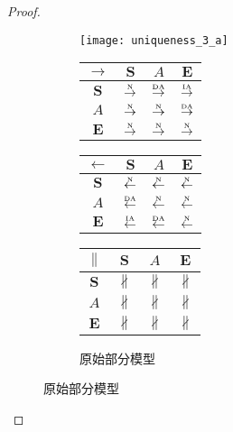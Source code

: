 \begin{proof}
\begin{figure}[htbp]
  \begin{subfigure}{1\textwidth}
    \centering
    \begin{minipage}[b]{1\textwidth}
      \centering
      \texttt{[image: uniqueness\_3\_a]}
    \end{minipage}
    \begin{minipage}[b]{0.3\textwidth}
      \vspace{1em}
      \centering
      \begin{tabular}{|c|c|c|c|} \hline
        $\rightarrow$ & $\bm{S}$ & $A$ & $\bm{E}$\\ \hline
        $\bm{S}$ & $\overset{\text{\tiny{N}}}{\rightarrow}$ & $\overset{\text{\tiny{DA}}}{\rightarrow}$ & $\overset{\text{\tiny{IA}}}{\rightarrow}$\\ \hline
        $A$ & $\overset{\text{\tiny{N}}}{\rightarrow}$ & $\overset{\text{\tiny{N}}}{\rightarrow}$ & $\overset{\text{\tiny{DA}}}{\rightarrow}$\\ \hline
        $\bm{E}$ & $\overset{\text{\tiny{N}}}{\rightarrow}$ & $\overset{\text{\tiny{N}}}{\rightarrow}$ & $\overset{\text{\tiny{N}}}{\rightarrow}$\\ \hline
      \end{tabular}
    \end{minipage}
    \begin{minipage}[b]{0.3\textwidth}
      \vspace{1em}
      \centering
      \begin{tabular}{|c|c|c|c|} \hline
        $\leftarrow$ & $\bm{S}$ & $A$ & $\bm{E}$\\ \hline
        $\bm{S}$ & $\overset{\text{\tiny{N}}}{\leftarrow}$ & $\overset{\text{\tiny{N}}}{\leftarrow}$ & $\overset{\text{\tiny{N}}}{\leftarrow}$\\ \hline
        $A$ & $\overset{\text{\tiny{DA}}}{\leftarrow}$ & $\overset{\text{\tiny{N}}}{\leftarrow}$ & $\overset{\text{\tiny{N}}}{\leftarrow}$\\ \hline
        $\bm{E}$ & $\overset{\text{\tiny{IA}}}{\leftarrow}$ & $\overset{\text{\tiny{DA}}}{\leftarrow}$ & $\overset{\text{\tiny{N}}}{\leftarrow}$\\ \hline
      \end{tabular}
    \end{minipage}
    \begin{minipage}[b]{0.3\textwidth}
      \vspace{1em}
      \centering
      \begin{tabular}{|c|c|c|c|} \hline
        $\parallel$ & $\bm{S}$ & $A$ & $\bm{E}$\\ \hline
        $\bm{S}$ & $\nparallel$ & $\nparallel$ & $\nparallel$\\ \hline
        $A$ & $\nparallel$ & $\nparallel$ & $\nparallel$\\ \hline
        $\bm{E}$ & $\nparallel$ & $\nparallel$ & $\nparallel$\\ \hline
      \end{tabular}
    \end{minipage}
    \caption{原始部分模型}
    \label{fig:uniqueness_3_a}
  \end{subfigure}


\end{figure}
\end{proof}
